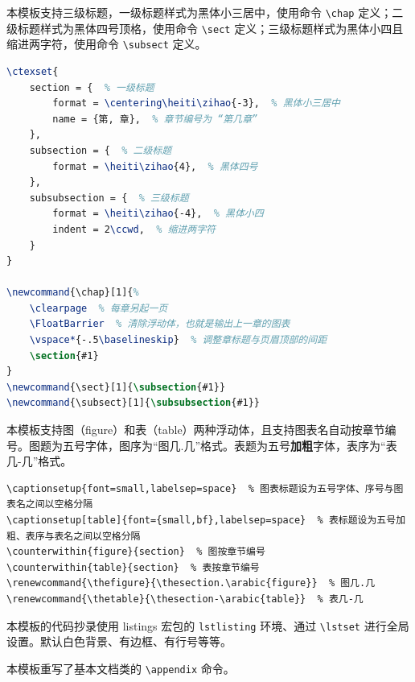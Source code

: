 本模板支持三级标题，一级标题样式为黑体小三居中，使用命令 \verb!\chap! 定义；二级标题样式为黑体四号顶格，使用命令 \verb!\sect! 定义；三级标题样式为黑体小四且缩进两字符，使用命令 \verb!\subsect! 定义。
\begin{lstlisting}[numbers=none,language=TeX]
% 标题设置
\ctexset{
	section = {  % 一级标题
		format = \centering\heiti\zihao{-3},  % 黑体小三居中
		name = {第, 章},  % 章节编号为 “第几章”
	},
	subsection = {  % 二级标题
		format = \heiti\zihao{4},  % 黑体四号
	},
	subsubsection = {  % 三级标题
		format = \heiti\zihao{-4},  % 黑体小四
        indent = 2\ccwd,  % 缩进两字符
	}
}

\newcommand{\chap}[1]{%
	\clearpage  % 每章另起一页
    \FloatBarrier  % 清除浮动体，也就是输出上一章的图表
    \vspace*{-.5\baselineskip}  % 调整章标题与页眉顶部的间距
	\section{#1}
}
\newcommand{\sect}[1]{\subsection{#1}}
\newcommand{\subsect}[1]{\subsubsection{#1}}
\end{lstlisting}

本模板支持图（figure）和表（table）两种浮动体，且支持图表名自动按章节编号。图题为五号字体，图序为“图几.几”格式。表题为五号\textbf{加粗}字体，表序为“表几-几”格式。

\begin{lstlisting}[numbers=none]
\captionsetup{font=small,labelsep=space}  % 图表标题设为五号字体、序号与图表名之间以空格分隔
\captionsetup[table]{font={small,bf},labelsep=space}  % 表标题设为五号加粗、表序与表名之间以空格分隔
\counterwithin{figure}{section}  % 图按章节编号
\counterwithin{table}{section}  % 表按章节编号
\renewcommand{\thefigure}{\thesection.\arabic{figure}}  % 图几.几
\renewcommand{\thetable}{\thesection-\arabic{table}}  % 表几-几
\end{lstlisting}

本模板的代码抄录使用 listings 宏包的 \verb!lstlisting! 环境、通过 \verb!\lstset! 进行全局设置。默认白色背景、有边框、有行号等等。

本模板重写了基本文档类的 \verb!\appendix! 命令。


